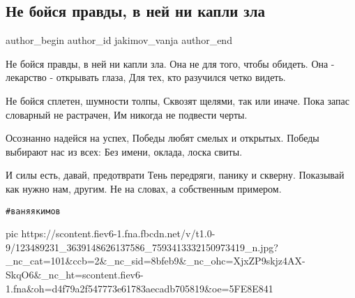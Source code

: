  
 
 
 
 
 
\subsection{Не бойся правды, в ней ни капли зла}
\label{sec:02_11_2020.fb.jakimov_vanja.1.ne_bojsja_pravdy}
\ifcmt
	author_begin
   author_id jakimov_vanja
	author_end
\fi

\begin{multicols}{2}
	\obeycr
Не бойся правды, в ней ни капли зла.
Она не для того, чтобы обидеть.
Она - лекарство - открывать глаза, 
Для тех, кто разучился четко видеть.

Не бойся сплетен, шумности толпы,
Сквозят щелями, так или иначе.
Пока запас словарный не растрачен,
Им никогда не подвести черты.

Осознанно надейся на успех,
Победы любят смелых и открытых.
Победы выбирают нас из всех:
Без имени, оклада, лоска свиты.

И силы есть, давай, предотврати
Тень передряги, панику и скверну.
Показывай как нужно нам, другим. 
Не на словах, а собственным примером.
	\restorecr
\end{multicols}

\verb|#ваняякимов|

\ifcmt
pic https://scontent.fiev6-1.fna.fbcdn.net/v/t1.0-9/123489231_3639148626137586_7593413332150973419_n.jpg?_nc_cat=101&ccb=2&_nc_sid=8bfeb9&_nc_ohc=XjxZP9skjz4AX-SkqO6&_nc_ht=scontent.fiev6-1.fna&oh=d4f79a2f547773e61783aecadb705819&oe=5FE8E841
\fi

